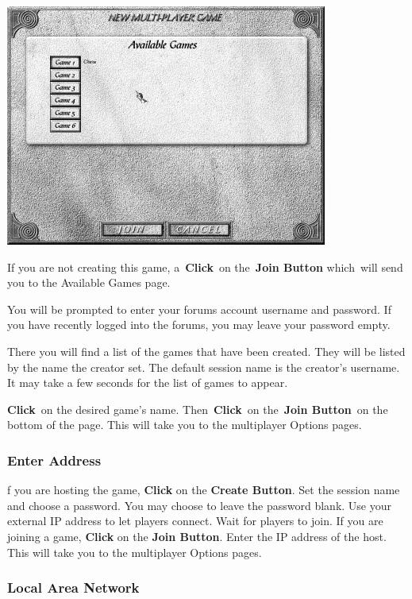 \begin{center}
	\includegraphics[width=0.9\linewidth]{Imultiplayer2}
\end{center}

If you are not creating this game, a \textbf{Click} on the \textbf{Join Button} which will send you to the Available Games page.

You will be prompted to enter your forums account username and password. If you have recently logged into the forums, you may leave your password empty.

There you will find a list of the games that have been created. They will be listed by the name the creator set. The default session name is the creator’s username. It may take a few seconds for the list of games to appear.

\textbf{Click} on the desired game’s name. Then \textbf{Click} on the \textbf{Join Button} on the bottom of the page. This will take you to the multiplayer Options pages.

\subsubsection{Enter Address}

f you are hosting the game, \textbf{Click} on the \textbf{Create Button}. Set the session name and choose a password. You may choose to leave the password blank. Use your external IP address to let players connect. Wait for players to join. If you are joining a game, \textbf{Click} on the \textbf{Join Button}. Enter the IP address of the host. This will take you to the multiplayer Options pages.

\subsubsection{Local Area Network}

